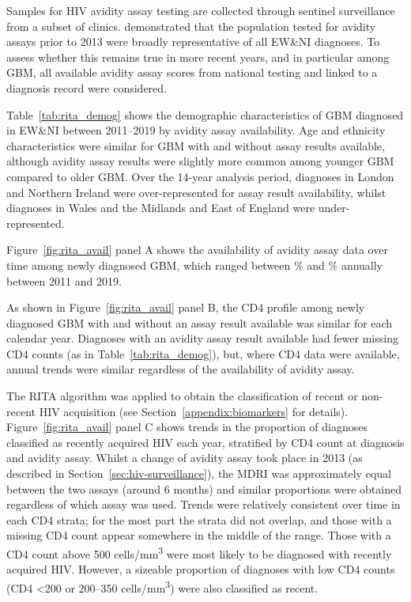 Samples for HIV avidity assay testing are collected through sentinel surveillance from a subset of clinics. \cite{Aghaizu2018-kk} demonstrated that the population tested for avidity assays prior to 2013 were broadly representative of all EW\&NI diagnoses. To assess whether this remains true in more recent years, and in particular among GBM, all available avidity assay scores from national testing and linked to a diagnosis record were considered.

Table~\ref{tab:rita_demog} shows the demographic characteristics of GBM diagnosed in EW\&NI between 2011--2019 by avidity assay availability. Age and ethnicity characteristics were similar for GBM with and without assay results available, although avidity assay results were slightly more common among younger GBM compared to older GBM\@. Over the 14-year analysis period, diagnoses in London and Northern Ireland were over-represented for assay result availability, whilst diagnoses in Wales and the Midlands and East of England were under-represented.



Figure~\ref{fig:rita_avail} panel A shows the availability of avidity assay data over time among newly diagnosed GBM, which ranged between \% and \% annually between 2011 and 2019.

As shown in Figure~\ref{fig:rita_avail} panel B, the CD4 profile among newly diagnosed GBM with and without an assay result available was similar for each calendar year. Diagnoses with an avidity assay result available had fewer missing CD4 counts (as in Table~\ref{tab:rita_demog}), but, where CD4 data were available, annual trends were similar regardless of the availability of avidity assay.

The RITA algorithm was applied to obtain the classification of recent or non-recent HIV acquisition (see Section~\ref{appendix:biomarkers} for details). Figure~\ref{fig:rita_avail} panel C shows trends in the proportion of diagnoses classified as recently acquired HIV each year, stratified by CD4 count at diagnosis and avidity assay. Whilst a change of avidity assay took place in 2013 (as described in Section~\ref{sec:hiv-surveillance}), the MDRI was approximately equal between the two assays (around 6 months) and similar proportions were obtained regardless of which assay was used. Trends were relatively consistent over time in each CD4 strata; for the most part the strata did not overlap, and those with a missing CD4 count appear somewhere in the middle of the range. Those with a CD4 count above 500 cells/mm\textsuperscript{3} were most likely to be diagnosed with recently acquired HIV\@. However, a sizeable proportion of diagnoses with low CD4 counts (CD4 <200 or 200--350 cells/mm\textsuperscript{3}) were also classified as recent.

